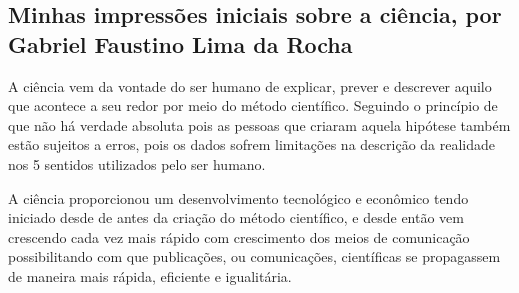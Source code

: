 \subsection{Minhas impressões iniciais sobre a ciência, por Gabriel Faustino Lima da Rocha}

A ciência vem da vontade do ser humano de explicar, prever e descrever aquilo que acontece a seu redor por meio do método científico. Seguindo o princípio de que não há verdade absoluta pois as pessoas que criaram aquela hipótese \citet{noauthor_hipotese_2020} também estão sujeitos a erros, pois os dados sofrem limitações na descrição da realidade nos 5 sentidos utilizados pelo ser humano.

A ciência proporcionou um desenvolvimento tecnológico e econômico tendo iniciado desde de antes da criação do método científico, e desde então vem crescendo cada vez mais rápido com crescimento dos meios de comunicação possibilitando com que publicações, ou comunicações, científicas se propagassem de maneira mais rápida, eficiente e igualitária.